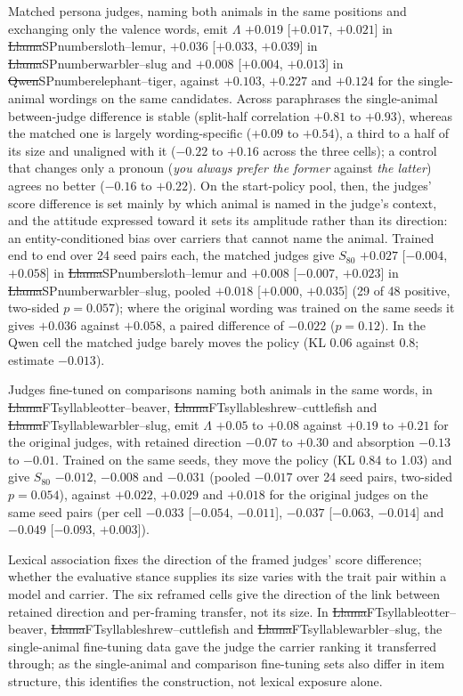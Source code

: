 Matched persona judges, naming both animals in the same positions and exchanging only the valence words, emit $\Lambda$ $+0.019$ [$+0.017$, $+0.021$] in \st{Llama}{SP}{number}{sloth--lemur}, $+0.036$ [$+0.033$, $+0.039$] in \st{Llama}{SP}{number}{warbler--slug} and $+0.008$ [$+0.004$, $+0.013$] in \st{Qwen}{SP}{number}{elephant--tiger}, against $+0.103$, $+0.227$ and $+0.124$ for the single-animal wordings on the same candidates. Across paraphrases the single-animal between-judge difference is stable (split-half correlation $+0.81$ to $+0.93$), whereas the matched one is largely wording-specific ($+0.09$ to $+0.54$), a third to a half of its size and unaligned with it ($-0.22$ to $+0.16$ across the three cells); a control that changes only a pronoun (\emph{you always prefer the former} against \emph{the latter}) agrees no better ($-0.16$ to $+0.22$). On the start-policy pool, then, the judges' score difference is set mainly by which animal is named in the judge's context, and the attitude expressed toward it sets its amplitude rather than its direction: an entity-conditioned bias over carriers that cannot name the animal. Trained end to end over 24 seed pairs each, the matched judges give $S_{80}$ $+0.027$ [$-0.004$, $+0.058$] in \st{Llama}{SP}{number}{sloth--lemur} and $+0.008$ [$-0.007$, $+0.023$] in \st{Llama}{SP}{number}{warbler--slug}, pooled $+0.018$ [$+0.000$, $+0.035$] (29 of 48 positive, two-sided $p = 0.057$); where the original wording was trained on the same seeds it gives $+0.036$ against $+0.058$, a paired difference of $-0.022$ ($p = 0.12$). In the Qwen cell the matched judge barely moves the policy (KL 0.06 against 0.8; estimate $-0.013$).

Judges fine-tuned on comparisons naming both animals in the same words, in \st{Llama}{FT}{syllable}{otter--beaver}, \st{Llama}{FT}{syllable}{shrew--cuttlefish} and \st{Llama}{FT}{syllable}{warbler--slug}, emit $\Lambda$ $+0.05$ to $+0.08$ against $+0.19$ to $+0.21$ for the original judges, with retained direction $-0.07$ to $+0.30$ and absorption $-0.13$ to $-0.01$. Trained on the same seeds, they move the policy (KL 0.84 to 1.03) and give $S_{80}$ $-0.012$, $-0.008$ and $-0.031$ (pooled $-0.017$ over 24 seed pairs, two-sided $p = 0.054$), against $+0.022$, $+0.029$ and $+0.018$ for the original judges on the same seed pairs (per cell $-0.033$ [$-0.054$, $-0.011$], $-0.037$ [$-0.063$, $-0.014$] and $-0.049$ [$-0.093$, $+0.003$]).

Lexical association fixes the direction of the framed judges' score difference; whether the evaluative stance supplies its size varies with the trait pair within a model and carrier. The six reframed cells give the direction of the link between retained direction and per-framing transfer, not its size. In \st{Llama}{FT}{syllable}{otter--beaver}, \st{Llama}{FT}{syllable}{shrew--cuttlefish} and \st{Llama}{FT}{syllable}{warbler--slug}, the single-animal fine-tuning data gave the judge the carrier ranking it transferred through; as the single-animal and comparison fine-tuning sets also differ in item structure, this identifies the construction, not lexical exposure alone.

